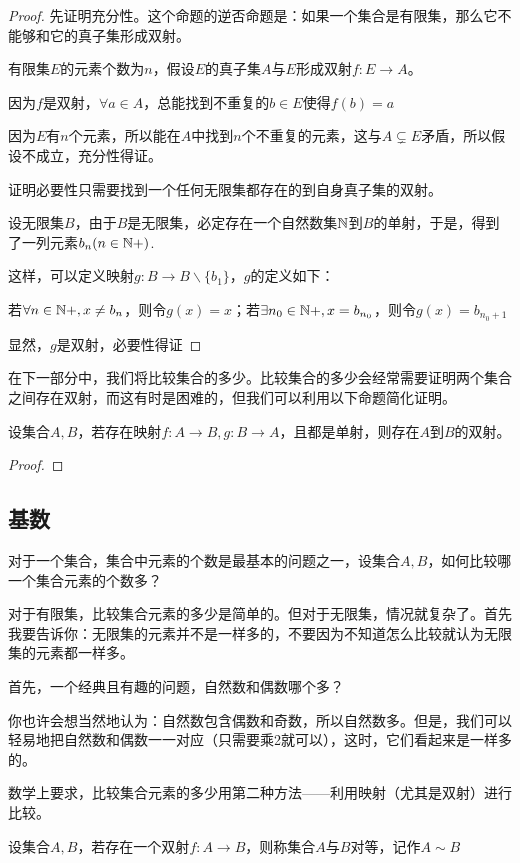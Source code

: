 \begin{proof}
    先证明充分性。这个命题的逆否命题是：如果一个集合是有限集，那么它不能够和它的真子集形成双射。

    有限集$E$的元素个数为$n$，假设$E$的真子集$A$与$E$形成双射$f:E\rightarrow A$。

    因为$f$是双射，$\forall a\in A$，总能找到不重复的$b\in E$使得$f(b) = a$

    因为$E$有$n$个元素，所以能在$A$中找到$n$个不重复的元素，这与$A\subsetneq E$矛盾，所以假设不成立，充分性得证。

    证明必要性只需要找到一个任何无限集都存在的到自身真子集的双射。

    设无限集$B$，由于$B$是无限集，必定存在一个自然数集$\mathbb{N}$到$B$的单射，于是，得到了一列元素${b_n}(n\in \mathbb{N}+)$.

    这样，可以定义映射$g:B\rightarrow B\backslash\{b_1\}$，$g$的定义如下：

    若$\forall n\in \mathbb{N}+,x\neq b_n$，则令$g(x) = x$；若$\exists  n_0\in\mathbb{N}+,x = b_{n_0}$，则令$g(x) = b_{n_0+1}$

    显然，$g$是双射，必要性得证
\end{proof}

在下一部分中，我们将比较集合的多少。比较集合的多少会经常需要证明两个集合之间存在双射，而这有时是困难的，但我们可以利用以下命题简化证明。

\begin{proposition}
    设集合$A,B$，若存在映射$f:A\rightarrow B,g:B\rightarrow A$，且都是单射，则存在$A$到$B$的双射。
\end{proposition}

\begin{proof}
    
\end{proof}

\subsection{基数}

对于一个集合，集合中元素的个数是最基本的问题之一，设集合$A,B$，如何比较哪一个集合元素的个数多？

对于有限集，比较集合元素的多少是简单的。但对于无限集，情况就复杂了。首先我要告诉你：无限集的元素并不是一样多的，不要因为不知道怎么比较就认为无限集的元素都一样多。

首先，一个经典且有趣的问题，自然数和偶数哪个多？

你也许会想当然地认为：自然数包含偶数和奇数，所以自然数多。但是，我们可以轻易地把自然数和偶数一一对应（只需要乘2就可以），这时，它们看起来是一样多的。

数学上要求，比较集合元素的多少用第二种方法——利用映射（尤其是双射）进行比较。

\begin{definition}
    设集合$A,B$，若存在一个双射$f:A\rightarrow B$，则称集合$A$与$B$对等，记作$A\sim B$
\end{definition}